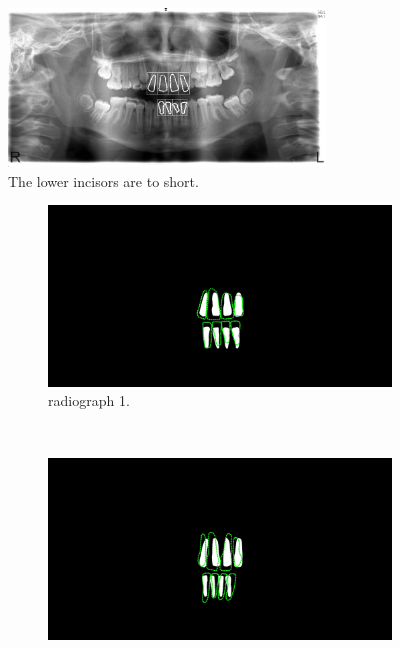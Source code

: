 \documentclass[a4paper,10pt]{article}
\begin{document}
\begin{figure}[h!]
  \centering
    \includegraphics[width=0.75\textwidth]{images/secondFailure.jpg}
  \caption{The lower incisors are to short.}
  \label{fig:secondFailure}
\end{figure}

\begin{figure}
\centering
        \caption{The comparison between our found incisors (white) and the real incisors (green) for:}\label{fig:animals}
        \begin{subfigure}[b]{0.45\textwidth}
                \includegraphics[width=\textwidth]{Images/segLand,1.jpg}
                \caption{ radiograph 1.}
                \label{fig:comp1}
        \end{subfigure}
        ~ %
        \begin{subfigure}[b]{0.45\textwidth}
                \includegraphics[width=\textwidth]{Images/segLand,2.jpg}

\end{subfigure}
\end{figure}
\end{document}

